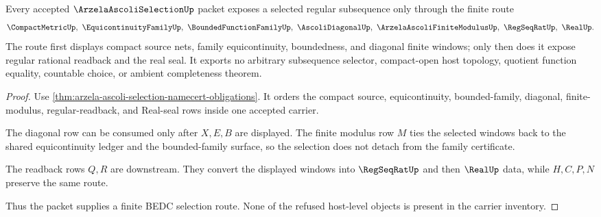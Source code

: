 \begin{theorem}
\label{thm:arzela-ascoli-selection-regular-subsequence-route}
Every accepted $\ArzelaAscoliSelectionUp$ packet exposes a selected regular subsequence only through the finite route
$$
\CompactMetricUp,\ \EquicontinuityFamilyUp,\ \BoundedFunctionFamilyUp,\ \AscoliDiagonalUp,\ \ArzelaAscoliFiniteModulusUp,\ \RegSeqRatUp,\ \RealUp .
$$
The route first displays compact source nets, family equicontinuity, boundedness, and diagonal finite windows; only then does it expose regular rational readback and the real seal. It exports no arbitrary subsequence selector, compact-open host topology, quotient function equality, countable choice, or ambient completeness theorem.
\end{theorem}
\begin{proof}
Use \autoref{thm:arzela-ascoli-selection-namecert-obligations}. It orders the compact source, equicontinuity, bounded-family, diagonal, finite-modulus, regular-readback, and Real-seal rows inside one accepted carrier.

The diagonal row can be consumed only after $X,E,B$ are displayed. The finite modulus row $M$ ties the selected windows back to the shared equicontinuity ledger and the bounded-family surface, so the selection does not detach from the family certificate.

The readback rows $Q,R$ are downstream. They convert the displayed windows into $\RegSeqRatUp$ and then $\RealUp$ data, while $H,C,P,N$ preserve the same route.

Thus the packet supplies a finite BEDC selection route. None of the refused host-level objects is present in the carrier inventory.
\end{proof}



